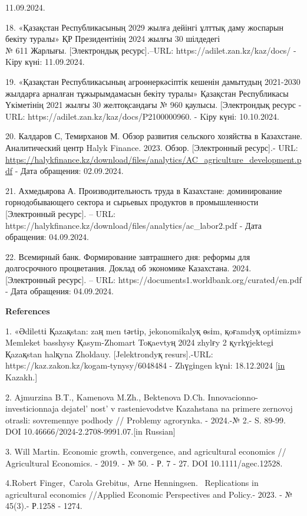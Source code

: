 {{11.09.2024.

18. «Қазақстан Республикасының 2029 жылға дейінгі ұлттық даму жоспарын
бекіту туралы» ҚР Президентінің 2024 жылғы 30 шілдедегі\\
№ 611 Жарлығы. {[}Электрондық ресурс{]}.--URL:
https://adilet.zan.kz/kaz/docs/ - Kіру күні: 11.09.2024.

19. «Қазақстан Республикасының агроөнеркәсіптік кешенін дамытудың
2021-2030 жылдарға арналған тұжырымдамасын бекіту туралы» Қазақстан
Республикасы Үкіметінің 2021 жылғы 30 желтоқсандағы № 960 қаулысы.
{[}Электрондық ресурс - URL: https://adilet.zan.kz/kaz/docs/P2100000960.
- Kіру күні: 10.10.2024.

20. Калдаров С, Темирханов М. Обзор развития сельского хозяйства в
Казахстане. Аналитический центр Halyk Finance. 2023. Обзор.
{[}Электронный ресурс{]}.- URL:
\url{https://halykfinance.kz/download/files/analytics/AC_agriculture_development.pdf}
- Дата обращения: 02.09.2024.

21. Ахмедьярова А. Производительность труда в Казахстане: доминирование
горнодобывающего сектора и сырьевых продуктов в промышленности
{[}Электронный ресурс{]}. -- URL:
https://halykfinance.kz/download/files/analytics/ac\_labor2.pdf - Дата
обращения: 04.09.2024.

22. Всемирный банк. Формирование завтрашнего дня: реформы для
долгосрочного процветания. Доклад об экономике Казахстана. 2024.
{[}Электронный ресурс{]}. -- URL:
https://documents1.worldbank.org/curated/en.pdf - Дата обращения:
04.09.2024.

{\bfseries References}

1. «Әdіlettі Қazaқstan: zaң men tәrtіp, jekonomikalyқ өsіm, қoғamdyқ
optimizm» Memleket basshysy Қasym-Zhomart Toқaevtyң 2024 zhylғy 2
қyrkүjektegі Қazaқstan halқyna Zholdauy. {[}Jelektrondyқ resurs{]}.-URL:
https://kaz.zakon.kz/kogam-tynysy/6048484 - Zhүgіngen kүnі: 18.12.2024
\href{https://kaz.zakon.kz/kogam-tynysy/6048484.\%20\%20\%20\%5bin}{{[}in}
Kazakh.{]}

2. Ajmurzina B.T., Kamenova M.Zh., Bektenova D.Ch.
Innovacionno-investicionnaja
dejatel' nost'{} v rastenievodstve
Kazahstana na primere zernovoj otrasli: sovremennye podhody // Problemy
agrorynka. - 2024.-№ 2.- S. 89-99. DOI
10.46666/2024-2.2708-9991.07.{[}in Russian{]}

3. Will Martin. Economic growth, convergence, and agricultural economics
// Agricultural Economics. - 2019. - № 50. - Р. 7 - 27. DOI
10.1111/agec.12528.

4.Robert Finger,~Carola Grebitus,~Arne Henningsen. ~Replications in
agricultural economics //Applied Economic Perspectives and Policy.-
2023. - № 45(3).- Р.1258 - 1274.

}}
